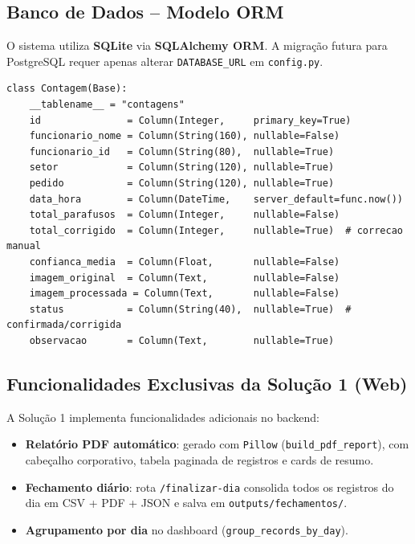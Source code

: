 \documentclass[12pt,a4paper]{article}
\begin{document}
\subsection{Banco de Dados -- Modelo ORM}

O sistema utiliza \textbf{SQLite} via \textbf{SQLAlchemy ORM}. A migra\c{c}\~ao
futura para PostgreSQL requer apenas alterar \texttt{DATABASE\_URL} em
\texttt{config.py}.

\begin{lstlisting}[caption={Modelo de dados compartilhado (\texttt{app/models.py})}]
class Contagem(Base):
    __tablename__ = "contagens"
    id               = Column(Integer,     primary_key=True)
    funcionario_nome = Column(String(160), nullable=False)
    funcionario_id   = Column(String(80),  nullable=True)
    setor            = Column(String(120), nullable=True)
    pedido           = Column(String(120), nullable=True)
    data_hora        = Column(DateTime,    server_default=func.now())
    total_parafusos  = Column(Integer,     nullable=False)
    total_corrigido  = Column(Integer,     nullable=True)  # correcao manual
    confianca_media  = Column(Float,       nullable=False)
    imagem_original  = Column(Text,        nullable=False)
    imagem_processada = Column(Text,       nullable=False)
    status           = Column(String(40),  nullable=True)  # confirmada/corrigida
    observacao       = Column(Text,        nullable=True)
\end{lstlisting}

\subsection{Funcionalidades Exclusivas da Solu\c{c}\~ao 1 (Web)}

A Solu\c{c}\~ao 1 implementa funcionalidades adicionais no backend:

\begin{itemize}[leftmargin=*]
  \item \textbf{Relat\'orio PDF autom\'atico}: gerado com \texttt{Pillow} (\texttt{build\_pdf\_report}),
        com cabe\c{c}alho corporativo, tabela paginada de registros e cards de resumo.
  \item \textbf{Fechamento di\'ario}: rota \texttt{/finalizar-dia} consolida todos os
        registros do dia em CSV + PDF + JSON e salva em \texttt{outputs/fechamentos/}.
  \item \textbf{Agrupamento por dia} no dashboard (\texttt{group\_records\_by\_day}).
\end{itemize}
\end{document}
